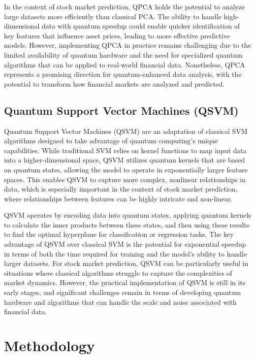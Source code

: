 \documentclass[journal]{IEEEtran}
\begin{document}
In the context of stock market prediction, QPCA holds the potential to analyze large datasets more efficiently than classical PCA. The ability to handle high-dimensional data with quantum speedup could enable quicker identification of key features that influence asset prices, leading to more effective predictive models. However, implementing QPCA in practice remains challenging due to the limited availability of quantum hardware and the need for specialized quantum algorithms that can be applied to real-world financial data. Nonetheless, QPCA represents a promising direction for quantum-enhanced data analysis, with the potential to transform how financial markets are analyzed and predicted.

\subsection{Quantum Support Vector Machines (QSVM)}
Quantum Support Vector Machines (QSVM) \cite{qsvm} are an adaptation of classical SVM algorithms designed to take advantage of quantum computing's unique capabilities. While traditional SVM relies on kernel functions to map input data into a higher-dimensional space, QSVM utilizes quantum kernels that are based on quantum states, allowing the model to operate in exponentially larger feature spaces. This enables QSVM to capture more complex, nonlinear relationships in data, which is especially important in the context of stock market prediction, where relationships between features can be highly intricate and non-linear.

QSVM operates by encoding data into quantum states, applying quantum kernels to calculate the inner products between these states, and then using these results to find the optimal hyperplane for classification or regression tasks. The key advantage of QSVM over classical SVM is the potential for exponential speedup in terms of both the time required for training and the model's ability to handle larger datasets. For stock market prediction, QSVM can be particularly useful in situations where classical algorithms struggle to capture the complexities of market dynamics. However, the practical implementation of QSVM is still in its early stages, and significant challenges remain in terms of developing quantum hardware and algorithms that can handle the scale and noise associated with financial data.

\section{Methodology}
\end{document}
